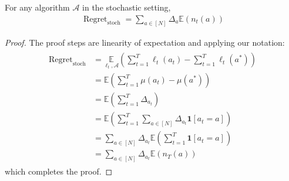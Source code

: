 \documentclass{article}
\begin{document}
\begin{lema}
  For any algorithm $\mathcal{A}$ in the stochastic setting,
\begin{align*}
\operatorname{ Regret }_{\mathrm{stoch }}=\sum_{a \in[N]} \Delta_{a} \mathbb{E}\left(n_{t}(a)\right)
\end{align*}
\end{lema}
\begin{proof}
  The proof steps are linearity of expectation and applying our notation:
\begin{align*}
\begin{aligned}
\operatorname{ Regret }_{\mathrm{stoch }} &=\underset{\ell_{t}, \mathcal{A}}{\mathbb{E}}\left(\sum_{t=1}^{T} \ell_{t}\left(a_{t}\right)-\sum_{t=1}^{T} \ell_{t}\left(a^{*}\right)\right) \\
&=\mathbb{E}\left(\sum_{t=1}^{T} \mu\left(a_{t}\right)-\mu\left(a^{*}\right)\right) \\
&=\mathbb{E}\left(\sum_{t=1}^{T} \Delta_{a_{t}}\right) \\
&=\mathbb{E}\left(\sum_{t=1}^{T} \sum_{a \in[N]} \Delta_{a_{t}} \mathbf{1}\left[a_{t}=a\right]\right) \\
&=\sum_{a \in[N]} \Delta_{a_{t}} \mathbb{E}\left(\sum_{t=1}^{T} \mathbf{1}\left[a_{t}=a\right]\right) \\
&=\sum_{a \in[N]} \Delta_{a_{t}} \mathbb{E}\left(n_{T}(a)\right)
\end{aligned}
\end{align*}
which completes the proof.
\end{proof} 
\end{document}
